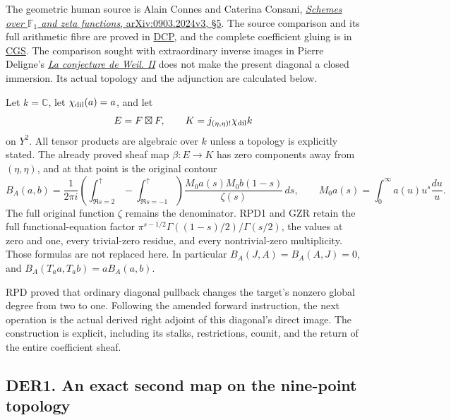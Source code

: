 The geometric human source is Alain Connes and Caterina Consani,
\href{https://arxiv.org/abs/0903.2024v3}{\emph{Schemes over
\(\mathbb F_1\) and zeta functions}, arXiv:0903.2024v3, §5}. The source
comparison and its full arithmetic fibre are proved in
\href{https://github.com/KokunoYumeto/zeta-function-research-reader/blob/36a82ecca98addb8a98b48204e349737856c7223/workbenches/splitzero-tandem/continuations/20260924-cohomology-weight-and-character-lifts/original-character-lifting/tau_lifting_weights_20260924/SOURCE_CC_DOUBLE_PULLBACK.md}{DCP},
and the complete coefficient gluing is in
\href{https://github.com/KokunoYumeto/zeta-function-research-reader/blob/36a82ecca98addb8a98b48204e349737856c7223/workbenches/splitzero-tandem/continuations/20260924-cohomology-weight-and-character-lifts/original-character-lifting/tau_lifting_weights_20260924/SOURCE_COEFFICIENT_GLUE.md}{CGS}.
The comparison sought with extraordinary inverse images in Pierre
Deligne's
\href{https://www.numdam.org/item/PMIHES_1980__52__137_0/}{\emph{La
conjecture de Weil. II}} does not make the present diagonal a closed
immersion. Its actual topology and the adjunction are calculated below.

Let \(k=\mathbb C\), let \(\chi_{\rm dil}(a)=a\), and let \[
E=F\boxtimes F,\qquad K=j_{(\eta,\eta)!}\chi_{\rm dil}k
\] on \(Y^2\). All tensor products are algebraic over \(k\) unless a
topology is explicitly stated. The already proved sheaf map
\(\beta:E\to K\) has zero components away from \((\eta,\eta)\), and at
that point is the original contour \[
B_A(a,b)=\frac1{2\pi i}
 \left(\int_{\Re s=2}^{\uparrow}-\int_{\Re s=-1}^{\uparrow}\right)
 \frac{M_0a(s)M_0b(1-s)}{\zeta(s)}\,ds,\qquad
M_0a(s)=\int_0^\infty a(u)u^s\frac{du}{u}.
\tag{DER0.1}
\] The full original function \(\zeta\) remains the denominator. RPD1
and GZR retain the full functional-equation factor
\(\pi^{s-1/2}\Gamma((1-s)/2)/\Gamma(s/2)\), the values at zero and one,
every trivial-zero residue, and every nontrivial-zero multiplicity.
Those formulas are not replaced here. In particular
\(B_A(J,A)=B_A(A,J)=0\), and \(B_A(T_aa,T_ab)=aB_A(a,b)\).

RPD proved that ordinary diagonal pullback changes the target's nonzero
global degree from two to one. Following the amended forward
instruction, the next operation is the actual derived right adjoint of
this diagonal's direct image. The construction is explicit, including
its stalks, restrictions, counit, and the return of the entire
coefficient sheaf.

\subsection{DER1. An exact second map on the nine-point
topology}\label{der1.-an-exact-second-map-on-the-nine-point-topology}

